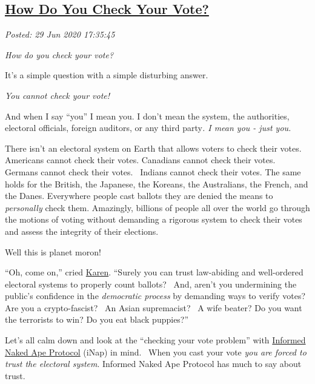 %

\subsection*{\href{http://analyzethedatanotthedrivel.org/2020/06/29/how-do-you-check-your-vote/}{How Do You Check Your Vote?}}


\noindent\emph{Posted: 29 Jun 2020 17:35:45}
\vspace{6pt}

\emph{How do you check your vote?}

It's a simple question with a simple disturbing answer.

\emph{You cannot check your vote!}

And when I say ``you'' I mean you. I don't mean the system, the
authorities, electoral officials, foreign auditors, or any third
party\emph{. I mean you - just you.}

There isn't an electoral system on Earth that allows voters to check
their votes. Americans cannot check their votes. Canadians cannot check
their votes. Germans cannot check their votes. ~Indians cannot check
their votes. The same holds for the British, the Japanese, the Koreans,
the Australians, the French, and the Danes. Everywhere people cast
ballots they are denied the means to \emph{personally} check them.
Amazingly, billions of people all over the world go through the motions
of voting without demanding a rigorous system to check their votes and
assess the integrity of their elections.

Well this is planet moron!

``Oh, come on,'' cried
\href{https://www.dictionary.com/e/slang/karen/}{Karen}. ``Surely you
can trust law-abiding and well-ordered electoral systems to properly
count ballots? ~And, aren't you undermining the public's confidence in
the \emph{democratic process} by demanding ways to verify votes? Are you
a crypto-fascist?~ An Asian supremacist?~ A wife beater? Do you want the
terrorists to win? Do you eat black puppies?''

Let's all calm down and look at the ``checking your vote problem'' with
\href{https://analyzethedatanotthedrivel.org/2018/05/08/informed-naked-ape-protocol/}{Informed
Naked Ape Protocol} (iNap) in mind.~ When you cast your vote \emph{you
are forced to trust the electoral system}. Informed Naked Ape Protocol
has much to say about trust.


